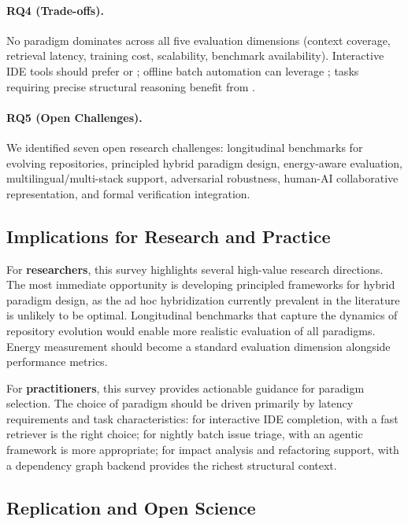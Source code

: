 \paragraph{RQ4 (Trade-offs).}
No paradigm dominates across all five evaluation dimensions (context coverage, retrieval
latency, training cost, scalability, benchmark availability). Interactive IDE tools should
prefer  or ; offline batch automation can leverage ; tasks
requiring precise structural reasoning benefit from .

\paragraph{RQ5 (Open Challenges).}
We identified seven open research challenges: longitudinal benchmarks for evolving repositories,
principled hybrid paradigm design, energy-aware evaluation, multilingual/multi-stack support,
adversarial robustness, human-AI collaborative representation, and formal verification
integration.

\subsection{Implications for Research and Practice}

For \textbf{researchers}, this survey highlights several high-value research directions. The
most immediate opportunity is developing principled frameworks for hybrid paradigm design,
as the ad hoc hybridization currently prevalent in the literature is unlikely to be optimal.
Longitudinal benchmarks that capture the dynamics of repository evolution would enable more
realistic evaluation of all paradigms. Energy measurement should become a standard evaluation
dimension alongside performance metrics.

For \textbf{practitioners}, this survey provides actionable guidance for paradigm selection.
The choice of paradigm should be driven primarily by latency requirements and task
characteristics: for interactive IDE completion,  with a fast retriever is the
right choice; for nightly batch issue triage,  with an agentic framework is more
appropriate; for impact analysis and refactoring support,  with a dependency graph
backend provides the richest structural context.

\subsection{Replication and Open Science}

